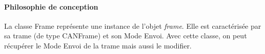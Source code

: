  \paragraph{Philosophie de conception}
La classe Frame représente une instance de l'objet \textit{frame}. Elle est caractérisée par sa trame (de type CANFrame) et son Mode Envoi. Avec cette classe, on peut récupérer le Mode Envoi de la trame mais aussi le modifier.\\